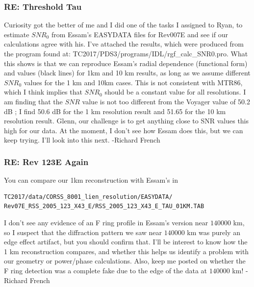 \documentclass[crop=false,class=book]{standalone}
\begin{document}
\subsubsection{\footnotesize RE: Threshold Tau}
Curiosity got the better of me and I did one of the tasks I assigned to Ryan, to estimate $SNR_{0}$ from Essam's EASYDATA files for Rev007E and see if our calculations agree with his. I've attached the results, which were produced from the program found at: TC2017/PDS3/programs/IDL/rgf\_calc\_SNR0.pro. What this shows is that we can reproduce Essam's radial dependence (functional form) and values (black lines) for 1km and 10 km results, as long as we assume different $SNR_{0}$ values for the 1 km and 10km cases. This is not consistent with MTR86, which I think implies that $SNR_{0}$ should be a constant value for all resolutions. I am finding that the $SNR$ value is not too different from the Voyager value of 50.2 dB ; I find 50.6 dB for the 1 km resolution result and 51.65 for the 10 km resolution result. Glenn, our challenge is to get anything close to SNR values this high for our data. At the moment, I don't see how Essam does this, but we can keep trying. I'll look into this next. -Richard French
\subsubsection{\footnotesize RE: Rev 123E Again}
You can compare our 1km reconstruction with Essam's in 
\begin{lstlisting}[language=bash,basicstyle=\footnotesize]
TC2017/data/CORSS_8001_lien_resolution/EASYDATA/
Rev07E_RSS_2005_123_X43_E/RSS_2005_123_X43_E_TAU_01KM.TAB
\end{lstlisting}I don't see any evidence of an F ring profile in Essam's version near $140000$ km, so I suspect that the diffraction pattern we saw near $140000$ km was purely an edge effect artifact, but you should confirm that. I'll be interest to know how the 1 km reconstruction compares, and whether this helps us identify a problem with our geometry or power/phase calculations. Also, keep me posted on whether the F ring detection was a complete fake due to the edge of the data at $140000$ km! -Richard French
\end{document}

